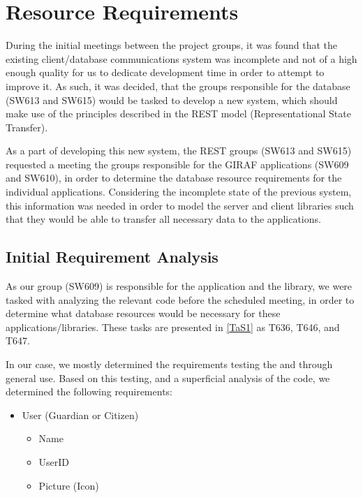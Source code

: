 \chapter{Resource Requirements}\label{S1CS}
During the initial meetings between the project groups, it was found that the
existing client/database communications system was incomplete and not of a high
enough quality for us to dedicate development time in order to attempt to
improve it. As such, it was decided, that the groups responsible for the
database (SW613 and SW615) would be tasked to develop a new system, which should
make use of the principles described in the REST model (Representational State
Transfer).\nl

As a part of developing this new system, the REST groups (SW613 and SW615)
requested a meeting the groups responsible for the GIRAF applications (SW609 and
SW610), in order to determine the database resource requirements for the
individual applications. Considering the incomplete state of the previous
system, this information was needed in order to model the server and client
libraries such that they would be able to transfer all necessary data to the
applications.\nl

\section{Initial Requirement Analysis}
As our group (SW609) is responsible for the  application and the
 library, we were tasked with analyzing the relevant
code before the scheduled meeting, in order to determine what database
resources would be necessary for these applications/libraries. These tasks are
presented in \autoref{TaS1} as T636, T646, and T647.\nl

In our case, we mostly determined the requirements testing the 
and  through general use. Based on this testing, and a
superficial analysis of the code, we determined the following requirements:

\begin{itemize}
  \item User (Guardian or Citizen)
  	\begin{itemize}
  		\item Name
  		\item UserID
  		\item Picture (Icon) 
	\end{itemize}
\end{itemize}




